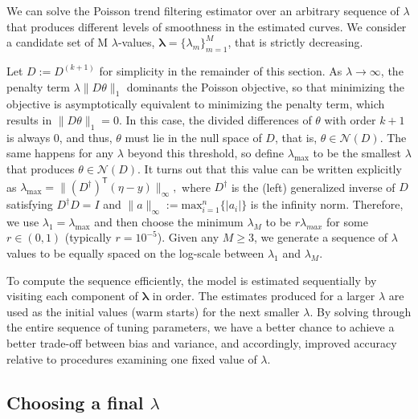 \documentclass[10pt,letterpaper]{article}
\newcommand{\lr}[1]{\left(#1\right)}
\newcommand{\snorm}[1]{\lVert #1 \rVert}
\renewcommand{\top}{\mathsf{T}}
\begin{document}
We can solve the Poisson trend filtering estimator over an arbitrary sequence of 
$\lambda$ that produces different levels of smoothness in the estimated curves. 
We consider a candidate set of M $\lambda$-values, $\boldsymbol{\lambda} = \{\lambda_m\}_{m=1}^M$,
that is strictly decreasing.


Let $D := D^{(k+1)}$ for simplicity in the remainder of this section. As
$\lambda \to\infty$, the penalty term $\lambda \snorm{D\theta}_1$ dominants the
Poisson objective, so that minimizing the objective is asymptotically equivalent
to minimizing the penalty term, which results in $\snorm{D\theta}_1 = 0$. In
this case, the divided differences of $\theta$ with order $k+1$ is always $0$,
and thus, $\theta$ must lie in the null space of $D$, that is,
$\theta\in\mathcal{N}(D)$. The same happens for any $\lambda$ beyond this
threshold, so define $\lambda_{\textrm{max}}$ to be the smallest $\lambda$ that
produces $\theta\in\mathcal{N}(D)$. It turns out that this value can be written
explicitly as $\lambda_{\textrm{max}} = \snorm{\lr{D^{\dagger}}^{\top} \lr{\eta
- y}}_{\infty},$ where $D^{\dagger}$ is the (left) generalized inverse of $D$
satisfying $D^{\dagger} D = I$ and $\snorm{a}_{\infty} := \mathrm{max}_{i=1}^n\{|a_i|\}$ is the infinity norm. 
Therefore, we use $\lambda_1 =
\lambda_{\textrm{max}}$ and then choose the minimum $\lambda_M$ to be
$r\lambda_{max}$ for some $r \in (0,1)$ (typically $r=10^{-5}$). Given any
$M\geq 3$, we generate a sequence of $\lambda$ values to be equally spaced on
the log-scale between $\lambda_1$ and $\lambda_M$. 

To compute the sequence efficiently, the model is estimated sequentially by
visiting each component of $\boldsymbol{\lambda}$ in order. The estimates
produced for a larger $\lambda$ are used as the initial values (warm starts) for
the next smaller $\lambda$. By solving through the entire sequence of tuning
parameters, we have a better chance to achieve a better trade-off between bias
and variance, and accordingly, improved accuracy relative to procedures
examining one fixed value of $\lambda$.


\subsection{Choosing a final $\lambda$}
\label{sec:cv}
\end{document}

